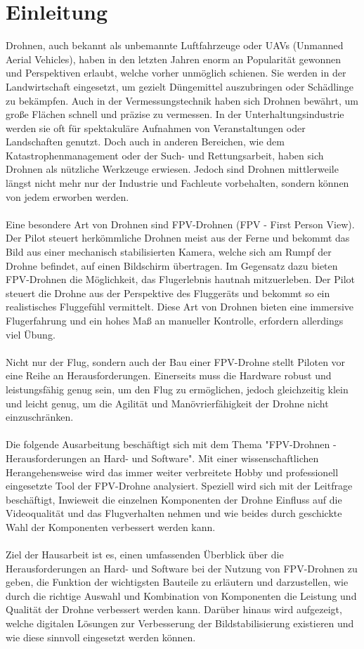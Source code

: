 \section[Einleitung]{Einleitung}

Drohnen, auch bekannt als unbemannte Luftfahrzeuge oder UAVs (Unmanned Aerial Vehicles), haben in den letzten Jahren enorm an Popularität gewonnen und Perspektiven erlaubt, welche vorher unmöglich schienen. Sie werden in der Landwirtschaft eingesetzt, um gezielt Düngemittel auszubringen oder Schädlinge zu bekämpfen. Auch in der Vermessungstechnik haben sich Drohnen bewährt, um große Flächen schnell und präzise zu vermessen. In der Unterhaltungsindustrie werden sie oft für spektakuläre Aufnahmen von Veranstaltungen oder Landschaften genutzt. Doch auch in anderen Bereichen, wie dem Katastrophenmanagement oder der Such- und Rettungsarbeit, haben sich Drohnen als nützliche Werkzeuge erwiesen. Jedoch sind Drohnen mittlerweile längst nicht mehr nur der Industrie und Fachleute vorbehalten, sondern können von jedem erworben werden.
\\ \\
Eine besondere Art von Drohnen sind FPV-Drohnen (FPV - First Person View). Der Pilot steuert herkömmliche Drohnen meist aus der Ferne und bekommt das Bild aus einer mechanisch stabilisierten Kamera, welche sich am Rumpf der Drohne befindet, auf einen Bildschirm übertragen. Im Gegensatz dazu bieten FPV-Drohnen die Möglichkeit, das Flugerlebnis hautnah mitzuerleben. Der Pilot steuert die Drohne aus der Perspektive des Fluggeräts und bekommt so ein realistisches Fluggefühl vermittelt. Diese Art von Drohnen bieten eine immersive Flugerfahrung und ein hohes Maß an manueller Kontrolle, erfordern allerdings viel Übung.
\\ \\
Nicht nur der Flug, sondern auch der Bau einer FPV-Drohne stellt Piloten vor eine Reihe an Herausforderungen. Einerseits muss die Hardware robust und leistungsfähig genug sein, um den Flug zu ermöglichen, jedoch gleichzeitig klein und leicht genug, um die Agilität und Manövrierfähigkeit der Drohne nicht einzuschränken.
\\ \\
Die folgende Ausarbeitung beschäftigt sich mit dem Thema "FPV-Drohnen - Herausforderungen an Hard- und Software". Mit einer wissenschaftlichen Herangehensweise wird das immer weiter verbreitete Hobby und professionell eingesetzte Tool der FPV-Drohne analysiert. Speziell wird sich mit der Leitfrage beschäftigt, Inwieweit die einzelnen Komponenten der Drohne Einfluss auf die Videoqualität und das Flugverhalten nehmen und wie beides durch geschickte Wahl der Komponenten verbessert werden kann.
\\ \\
Ziel der Hausarbeit ist es, einen umfassenden Überblick über die Herausforderungen an Hard- und Software bei der Nutzung von FPV-Drohnen zu geben, die Funktion der wichtigsten Bauteile zu erläutern und darzustellen, wie durch die richtige Auswahl und Kombination von Komponenten die Leistung und Qualität der Drohne verbessert werden kann. Darüber hinaus wird aufgezeigt, welche digitalen Lösungen zur Verbesserung der Bildstabilisierung existieren und wie diese sinnvoll eingesetzt werden können.